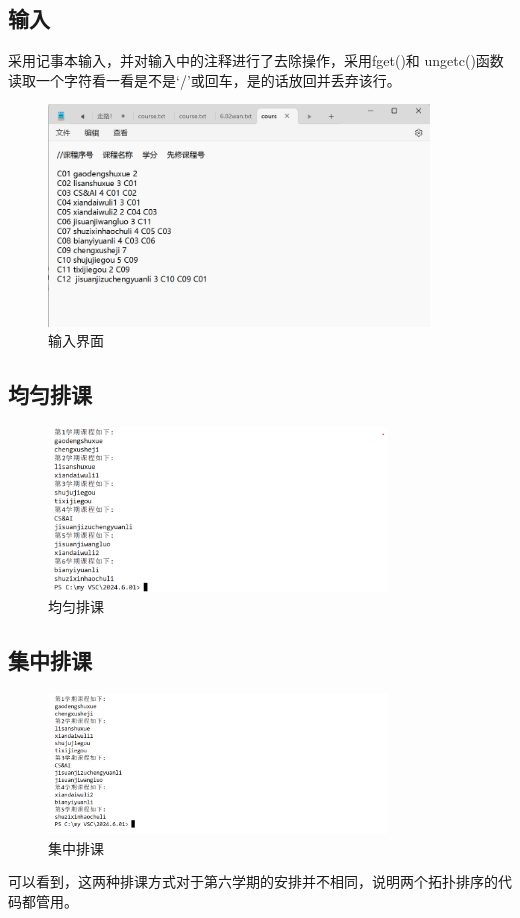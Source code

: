 \documentclass[a4,10pt]{article}
\begin{document}
    \subsection{输入}
    采用记事本输入，并对输入中的注释进行了去除操作，采用fget()和 ungetc()函数读取一个字符看一看是不是‘/’或回车，是的话放回并丢弃该行。
\begin{figure}[h]
    \centering
\includegraphics[width=0.9\textwidth]{6023.png}
    \caption{输入界面}
    \label{fig:enter}
\end{figure}
\vspace{0.5cm}
    \subsection{均匀排课}
    \begin{figure}[H]
    \centering
\includegraphics[width=0.8\textwidth]{6026.png}
    \caption{均匀排课}
    \label{fig:junyun}
\end{figure}
\vspace{0.5cm}
    \subsection{集中排课}
    \begin{figure}[H]
    \centering
\includegraphics[width=0.8\textwidth]{6025.png}
    \caption{集中排课}
    \label{fig:enter-label}
\end{figure}
可以看到，这两种排课方式对于第六学期的安排并不相同，说明两个拓扑排序的代码都管用。
\end{document}
